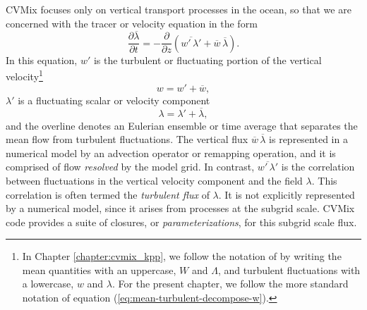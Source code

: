 CVMix focuses only on vertical transport processes in the ocean, so
that we are concerned with the tracer or velocity equation in the form
\begin{equation}
  \frac{\partial \overline{\lambda} }{\partial t}  = 
 - \frac{\partial}{\partial z}  \left( \overline{w' \, \lambda'} + \overline{w} \, \overline{\lambda} \right). 
\end{equation}
In this equation, $w'$ is the turbulent or fluctuating portion of the
vertical velocity\footnote{In Chapter \ref{chapter:cvmix_kpp}, we
  follow the notation of \cite{LargeKPP} by writing the mean
  quantities with an uppercase, $W$ and $\Lambda$, and turbulent
  fluctuations with a lowercase, $w$ and $\lambda$. For the present
  chapter, we follow the more standard notation of equation
  (\ref{eq:mean-turbulent-decompose-w}).}
\begin{equation}
 w = w' + \overline{w},
\label{eq:mean-turbulent-decompose-w}
\end{equation}
$\lambda'$ is a fluctuating scalar or velocity component
\begin{equation}
 \lambda = \lambda' + \overline{\lambda},
\label{eq:mean-turbulent-decompose-lambda}
\end{equation}
and the overline denotes an Eulerian ensemble or time average that
separates the mean flow from turbulent fluctuations.  The vertical
flux $\overline{w} \, \overline{\lambda}$ is represented in a
numerical model by an advection operator or remapping operation, and
it is comprised of flow {\it resolved} by the model grid.  In
contrast, $\overline{w' \, \lambda'}$ is the correlation between
fluctuations in the vertical velocity component and the field
$\lambda$. This correlation is often termed the {\it turbulent flux}
of $\lambda$.  It is not explicitly represented by a numerical model,
since it arises from processes at the subgrid scale.  CVMix code
provides a suite of closures, or {\it parameterizations}, for this
subgrid scale flux.

